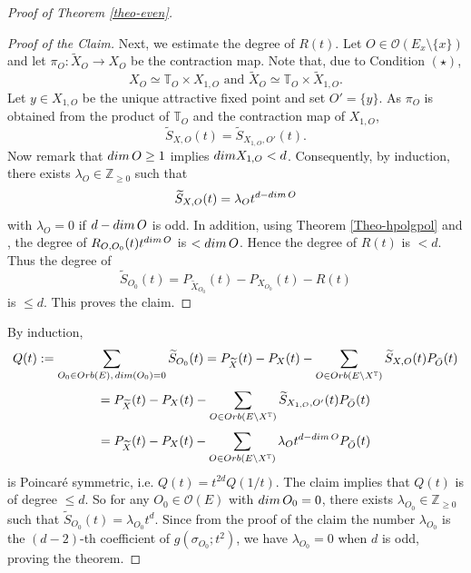 \documentclass[11pt, reqno]{amsart}
\theoremstyle{plain}
\theoremstyle{definition}
\theoremstyle{remark}
\begin{document}
\begin{proof}[Proof of Theorem \ref{theo-even}]
\begin{proof}[Proof of the Claim]
Next, we estimate the degree of $R(t)$. Let $O\in\mathcal{O}(E_{x}\setminus\{x\})$ and let $\pi_{O}: \widetilde{X}_{O}\rightarrow X_{O}$ be the contraction map. Note 
that, due to Condition $(\star)$,  $$X_{O}\simeq \mathbb{T}_{O}\times X_{1, O}\text{ and }\widetilde{X}_{O}\simeq \mathbb{T}_{O}\times \widetilde{X}_{1, O}.$$  Let $y\in X_{1, O}$ be the unique attractive fixed point and set $O' =  \{y\}$. As $\pi_{O}$ is obtained from the product 
of $\mathbb{T}_{O}$ and the contraction map of $X_{1, O}$, 
$$\widetilde{S}_{X, O}(t) =  \widetilde{S}_{ X_{1, O}, O'}(t).$$
Now remark that ${\rm dim}\, O\geq 1$ implies ${\rm dim} X_{1, O} <d $. Consequently,
by induction, there exists $\lambda_{O}\in\mathbb{Z}_{\geq 0}$ such that 
$$\widetilde{S}_{X, O}(t) =  \lambda_{O}t^{d- {\rm dim}\, O}$$
with $\lambda_{O} = 0$ if $d - {\rm dim}\, O$ is odd. 
In addition, using Theorem \ref{Theo-hpolgpol} and \cite[Lemma 5.20]{AL21}, the degree of $R_{O, O_{0}}(t)t^{{\rm dim}\, O}$ is $< {\rm dim}\, O$. Hence the degree of $R(t)$ is $< d$.  Thus the degree of
$$\widetilde{S}_{O_{0}}(t) =  P_{\widetilde{X}_{O_{0}}}(t) -  P_{X_{O_{0}}}(t)-R(t)$$
is $\leq d$. 
This proves the claim. 
\end{proof}
By induction,
$$Q(t):= \sum_{O_{0}\in {\rm Orb}(E),\, {\rm dim}(O_{0}) =  0}\widetilde{S}_{O_{0}}(t)  =  P_{\widetilde{X}}(t) - P_{X}(t) -  \sum_{O\in {\rm Orb}(E\setminus X^{\mathbb{T}})}\widetilde{S}_{X, O}(t)P_{\bar{O}}(t) $$
$$ =  P_{\widetilde{X}}(t) - P_{X}(t) -  \sum_{O\in{\rm Orb}(E\setminus X^{\mathbb{T}})}\widetilde{S}_{X_{1, O}, O'}(t)P_{\bar{O}}(t) $$
$$=  P_{\widetilde{X}}(t) - P_{X}(t) - \sum_{O\in{\rm Orb}(E\setminus X^{\mathbb{T}})}\lambda_{O}t^{d - {\rm dim}\, O}P_{\bar{O}}(t)$$
is Poincar\'e symmetric, i.e. $Q(t) =  t^{2d}Q(1/t)$.
The claim implies
that $Q(t)$ is of degree $\leq d$. So  for any $O_{0}\in \mathcal{O}(E)$ with ${\rm dim}\, O_{0} = 0$, there exists   $\lambda_{O_{0}}\in \mathbb{Z}_{\geq 0}$ such that $\widetilde{S}_{O_{0}}(t) =  \lambda_{O_{0}}t^{d}$. Since from the proof of the claim the number $\lambda_{O_{0}}$ is the $(d - 2)$-th coefficient 
of $g(\sigma_{O_{0}}; t^{2})$, we have $\lambda_{O_{0}} =  0$ when $d$ is odd, proving the theorem. 
\end{proof}
\end{document}
